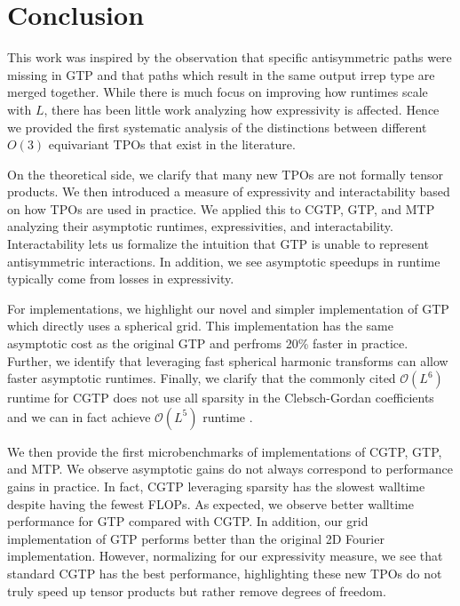\documentclass{article}
\renewcommand{\O}{\mathcal{O}}
\theoremstyle{definition}
\theoremstyle{remark}
\begin{document}



\section{Conclusion}

This work was inspired by the observation that specific antisymmetric paths were missing in GTP and that paths which result in the same output irrep type are merged together. While there is much focus on improving how runtimes scale with $L$, there has been little work analyzing how expressivity is affected. Hence we provided the first systematic analysis of the distinctions between different $O(3)$ equivariant TPOs that exist in the literature.

On the theoretical side, we clarify that many new TPOs are not formally tensor products. We then introduced a measure of expressivity and interactability based on how TPOs are used in practice. We applied this to CGTP, GTP, and MTP analyzing their asymptotic runtimes, expressivities, and interactability. Interactability lets us formalize the intuition that GTP is unable to represent antisymmetric interactions. In addition, we see asymptotic speedups in runtime typically come from losses in expressivity.

For implementations, we highlight our novel and simpler implementation of GTP which directly uses a spherical grid. This implementation has the same asymptotic cost as the original GTP and perfroms 20\% faster in practice. Further, we identify that leveraging fast spherical harmonic transforms can allow faster asymptotic runtimes. Finally, we clarify that the commonly cited $\O(L^6)$ runtime for CGTP does not use all sparsity in the Clebsch-Gordan coefficients and we can in fact achieve $\O(L^5)$ runtime \citep{cobbefficient}.

We then provide the first microbenchmarks of implementations of CGTP, GTP, and MTP. We observe asymptotic gains do not always correspond to performance gains in practice. In fact, CGTP leveraging sparsity has the slowest walltime despite having the fewest FLOPs. As expected, we observe better walltime performance for GTP compared with CGTP. In addition, our grid implementation of GTP performs better than the original 2D Fourier implementation. However, normalizing for our expressivity measure, we see that standard CGTP has the best performance, highlighting these new TPOs do not truly speed up tensor products but rather remove degrees of freedom.
\end{document}

